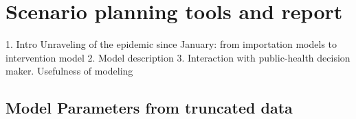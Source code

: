 \chapter{Scenario planning tools and report}
\label{sec:covid-pipeline-reports}


1. Intro Unraveling of the epidemic since January: from importation models to intervention model
2. Model description
3. Interaction with public-health decision maker. Usefulness of modeling

\section{Model Parameters from truncated data}

